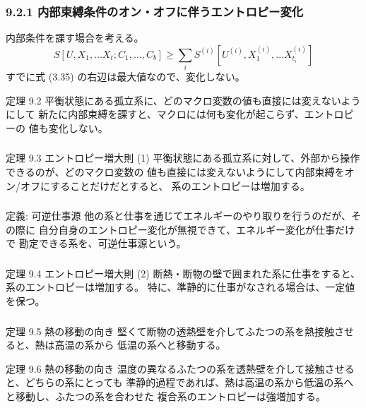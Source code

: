 \documentclass[aspectratio=149]{beamer}
\begin{document}
\begin{frame}
	\frametitle{9.2.1 内部束縛条件のオン・オフに伴うエントロピー変化}
	内部条件を課す場合を考える。
	\[
		S[U,X_1,\dots X_t;C_1,\dots,C_b]
		\geq \sum_i S^{(i)}[U^{(i)},X^{(i)}_1,\dots X^{(i)}_{t_i}]\tag{3.35}
	\]
	すでに式 (3.35) の右辺は最大値なので、変化しない。
	
	\begin{block}{定理 9.2}
		平衡状態にある孤立系に、どのマクロ変数の値も直接には変えないようにして
		新たに内部束縛を課すと、マクロには何も変化が起こらず、エントロピーの
		値も変化しない。
	\end{block}
\end{frame}

\begin{frame}
	\frametitle{}
	\begin{block}{定理 9.3 エントロピー増大則 (1)}
		平衡状態にある孤立系に対して、外部から操作できるのが、どのマクロ変数の
		値も直接には変えないようにして内部束縛をオン/オフにすることだけだとすると、
		系のエントロピーは増加する。
	\end{block}
\end{frame}

\begin{frame}
	\frametitle{}
	\begin{block}{定義: 可逆仕事源}
		他の系と仕事を通じてエネルギーのやり取りを行うのだが、その際に
		自分自身のエントロピー変化が無視できて、エネルギー変化が仕事だけで
		勘定できる系を、可逆仕事源という。
	\end{block}
\end{frame}

\begin{frame}
	\frametitle{}
	\begin{block}{定理 9.4 エントロピー増大則 (2)}
		断熱・断物の壁で囲まれた系に仕事をすると、系のエントロピーは増加する。
		特に、準静的に仕事がなされる場合は、一定値を保つ。
	\end{block}
\end{frame}

\begin{frame}
	\frametitle{}
	\begin{block}{定理 9.5 熱の移動の向き}
		堅くて断物の透熱壁を介してふたつの系を熱接触させると、熱は高温の系から
		低温の系へと移動する。
	\end{block}
	\begin{block}{定理 9.6 熱の移動の向き}
		温度の異なるふたつの系を透熱壁を介して接触させると、どちらの系にとっても
		準静的過程であれば、熱は高温の系から低温の系へと移動し、ふたつの系を合わせた
		複合系のエントロピーは強増加する。
	\end{block}
\end{frame}
\end{document}
